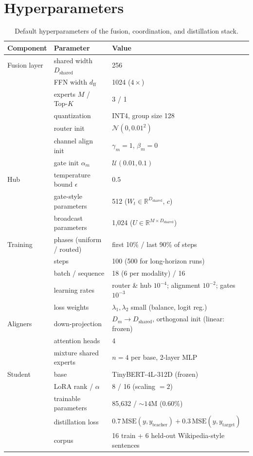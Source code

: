 \documentclass[10pt]{article}
\newcommand{\R}{\mathbb{R}}
\theoremstyle{definition}
\theoremstyle{plain}
\theoremstyle{remark}
\begin{document}
\appendix

\clearpage

\section{Hyperparameters}
\label{app:hyper}

\begin{table}[h]
\centering
\caption{Default hyperparameters of the fusion, coordination, and distillation stack.}
\small
\begin{tabular}{lll}
\toprule
\textbf{Component} & \textbf{Parameter} & \textbf{Value} \\
\midrule
Fusion layer & shared width $D_{\text{shared}}$ & 256 \\
 & FFN width $d_{\text{ff}}$ & 1024 ($4\times$) \\
 & experts $M$ / Top-$K$ & 3 / 1 \\
 & quantization & INT4, group size 128 \\
 & router init & $\mathcal{N}(0, 0.01^2)$ \\
 & channel align init & $\gamma_m = 1$, $\beta_m = 0$ \\
 & gate init $\alpha_m$ & $\mathcal{U}(0.01, 0.1)$ \\
\midrule
Hub & temperature bound $\epsilon$ & $0.5$ \\
 & gate-style parameters & 512 ($W_t \in \R^{D_{\text{shared}}}$, $c$) \\
 & broadcast parameters & 1{,}024 ($U \in \R^{M \times D_{\text{shared}}}$) \\
\midrule
Training & phases (uniform / routed) & first 10\% / last 90\% of steps \\
 & steps & 100 (500 for long-horizon runs) \\
 & batch / sequence & 18 (6 per modality) / 16 \\
 & learning rates & router \& hub $10^{-4}$; alignment $10^{-2}$; gates $10^{-3}$ \\
 & loss weights & $\lambda_1, \lambda_2$ small (balance, logit reg.) \\
\midrule
Aligners & down-projection & $D_m \rightarrow D_{\text{shared}}$, orthogonal init (linear: frozen) \\
 & attention heads & 4 \\
 & mixture shared experts & $n = 4$ per base, 2-layer MLP \\
\midrule
Student & base & TinyBERT-4L-312D (frozen) \\
 & LoRA rank / $\alpha$ & 8 / 16 (scaling $= 2$) \\
 & trainable parameters & 85{,}632 / ${\sim}14$M ($0.60\%$) \\
 & distillation loss & $0.7\,\mathrm{MSE}(y, y_{\text{teacher}}) + 0.3\,\mathrm{MSE}(y, y_{\text{target}})$ \\
 & corpus & 16 train + 6 held-out Wikipedia-style sentences \\
\bottomrule
\end{tabular}
\end{table}
\end{document}
